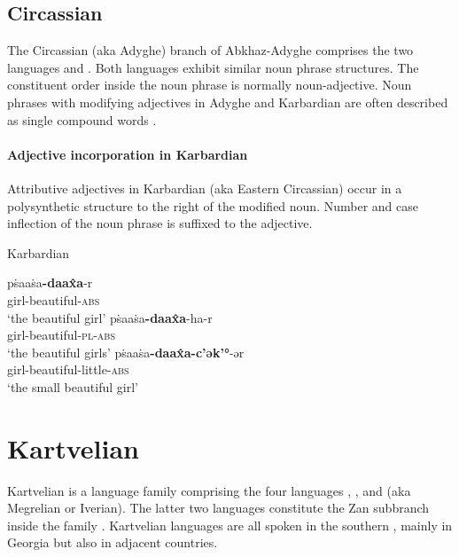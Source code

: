 \subsection{Circassian}
The Circassian (aka Adyghe) branch of Abkhaz-Adyghe comprises the two languages  and . Both languages exhibit similar noun phrase structures. The constituent order inside the noun phrase is normally noun-adjective. Noun phrases with modifying adjectives in Adyghe and Karbardian are often described as single compound words \citep[222]{comrie1981}.

\paragraph*{Adjective incorporation in Karbardian}
Attributive adjectives in Karbardian (aka Eastern Circassian) occur in a polysynthetic structure to the right of the modified noun. Number and case inflection of the noun phrase is suffixed to the adjective.
\begin{exe}
\ex \rm{Karbardian \citep[295]{colarusso1989}}
\begin{xlist}
\ex	
\gll	pṡaaṡa\textbf{-daax̂a}-r\\
	girl-beautiful-\textsc{abs}\\
\glt	‘the beautiful girl’
\ex
\gll	pṡaaṡa\textbf{-daax̂a}-ha-r\\
	girl-beautiful-\textsc{pl}-\textsc{abs}\\
\glt	‘the beautiful girls’
\ex
\gll	pṡaaṡa\textbf{-daax̂a-c'ək'°}-ər\\
	girl-beautiful-little-\textsc{abs}\\
\glt	‘the small beautiful girl’
\end{xlist}
\end{exe}

\section{Kartvelian}\label{kartvelian synchr}
Kartvelian is a language family comprising the four languages , ,  and  (aka Megrelian or Iverian). The latter two languages constitute the Zan subbranch inside the family \citep[220]{salminen2007}. Kartvelian languages are all spoken in the southern , mainly in Georgia but also in adjacent countries.

